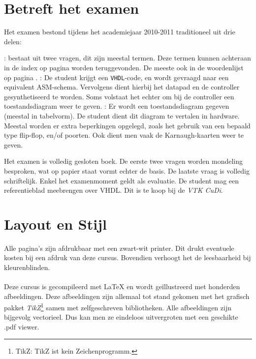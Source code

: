 \documentclass[a4paper,10pt,titlepage]{book}
\begin{document}
\begin{it}
\section*{Betreft het examen}
Het examen bestond tijdens het academiejaar 2010-2011 traditioneel uit drie delen:
\begin{enumerate}
 : bestaat uit twee vragen, dit zijn meestal termen. Deze termen kunnen achteraan in de index op pagina \pageref{idx} worden teruggevonden. De meeste ook in de woordenlijst op pagina \pageref{glos}.
 : De student krijgt een \texttt{VHDL}-code, en wordt gevraagd naar een equivalent ASM-schema. Vervolgens dient hierbij het datapad en de controller gesynthetiseerd te worden. Soms volstaat het echter om bij de controller een toestandsdiagram weer te geven.
 : Er wordt een toestandsdiagram gegeven (meestal in tabelvorm). De student dient dit diagram te vertalen in hardware. Meestal worden er extra beperkingen opgelegd, zoals het gebruik van een bepaald type flip-flop, en/of poorten. Ook dient men vaak de Karnaugh-kaarten weer te geven.
\end{enumerate}
Het examen is volledig gesloten boek. De eerste twee vragen worden mondeling besproken, wat op papier staat vormt echter de basis. De laatste vraag is volledig schriftelijk. Enkel het examenmoment geldt als evaluatie. De student mag een referentieblad meebrengen over VHDL. Dit is te koop bij de \emph{VTK CuDi}.

\section*{Layout en Stijl}
\paragraph{}
Alle pagina's zijn afdrukbaar met een zwart-wit printer. Dit drukt eventuele kosten bij een afdruk van deze cursus. Bovendien verhoogt het de leesbaarheid bij kleurenblinden.

\paragraph{}
Deze cursus is gecompileerd met \LaTeX{} en wordt ge\"illustreerd met honderden afbeeldingen. Deze afbeeldingen zijn allemaal tot stand gekomen met het grafisch pakket \emph{TikZ}\footnote{TikZ: TikZ ist kein Zeichenprogramm.} samen met zelfgeschreven bibliotheken. Alle afbeeldingen zijn bijgevolg vectorieel. Dus kan men ze eindeloos uitvergroten met een geschikte .pdf viewer.


\end{it}
\end{document}
